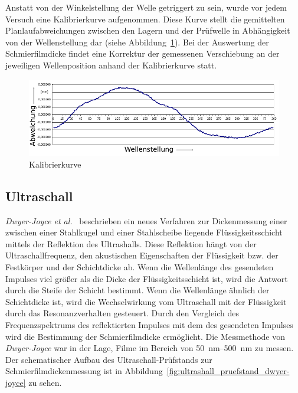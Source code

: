 Anstatt von der Winkelstellung der Welle getriggert zu sein, wurde vor jedem Versuch eine Kalibrierkurve aufgenommen.
Diese Kurve stellt die gemittelten Planlaufabweichungen zwischen den Lagern und der Prüfwelle in Abhängigkeit von der Wellenstellung dar (siehe Abbildung~\ref{fig:kalibrierkurve_kuhlmann}).
Bei der Auswertung der Schmierfilmdicke findet eine Korrektur der gemessenen Verschiebung an der jeweiligen Wellenposition anhand der Kalibrierkurve statt.

\begin{figure}[htb]
    \centering
    \includegraphics[]{./images/kalibrierkurve_kuhlmann.pdf}
    \caption{Kalibrierkurve~\cite{kuhlmann_2009}}
    \label{fig:kalibrierkurve_kuhlmann}
\end{figure}

\subsection{Ultraschall}
\label{sub:ultraschall}

\textit{Dwyer-Joyce et al.}~\cite{dwyer-joyce_2011} beschrieben ein neues Verfahren zur Dickenmessung einer zwischen einer Stahlkugel und einer Stahlscheibe liegende Flüssigkeitsschicht mittels der Reflektion des Ultrashalls.
Diese Reflektion hängt von der Ultraschallfrequenz, den akustischen Eigenschaften der Flüssigkeit bzw. der Festkörper und der Schichtdicke ab.
Wenn die Wellenlänge des gesendeten Impulses viel größer als die Dicke der Flüssigkeitsschicht ist, wird die Antwort durch die Steife der Schicht bestimmt.
Wenn die Wellenlänge ähnlich der Schichtdicke ist, wird die Wechselwirkung vom Ultraschall mit der Flüssigkeit durch das Resonanzverhalten gesteuert.
Durch den Vergleich des Frequenzspektrums des reflektierten Impulses mit dem des gesendeten Impulses wird die Bestimmung der Schmierfilmdicke ermöglicht.
Die Messmethode von \textit{Dwyer-Joyce} war in der Lage, Filme im Bereich von \SIrange{50}{500}{\nano\meter} zu messen.
Der schematischer Aufbau des Ultraschall-Prüfstands zur Schmierfilmdickenmessung ist in Abbildung~\ref{fig:ultrashall_pruefstand_dwyer-joyce} zu sehen.

